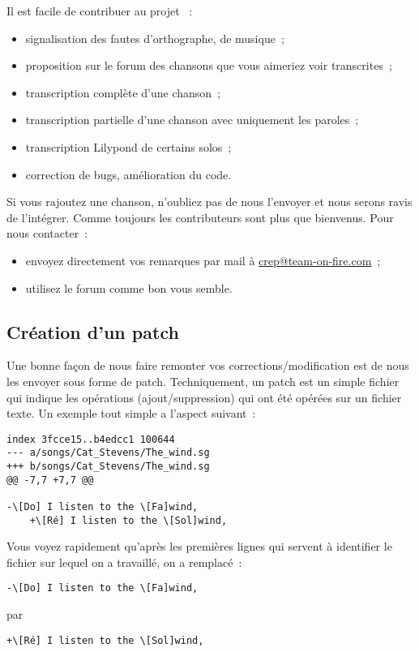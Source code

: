 \documentclass[online]{patacrep}
\begin{document}
Il est facile de contribuer au projet ~:

\begin{itemize}
\item signalisation des fautes d'orthographe, de musique~;
\item proposition sur le forum des chansons que vous aimeriez voir transcrites~;
\item transcription complète d'une chanson~;
\item transcription partielle d'une chanson avec uniquement les paroles~;
\item transcription Lilypond de certains solos~;
\item correction de bugs, amélioration du code.
\end{itemize}

Si vous rajoutez une chanson, n'oubliez pas de nous l'envoyer et nous
serons ravis de l'intégrer. Comme toujours les contributeurs sont plus
que bienvenus. Pour nous contacter~:

\begin{itemize}
\item envoyez directement vos remarques par mail à
  \url{crep@team-on-fire.com}~;
\item utilisez le forum comme bon vous semble.
\end{itemize}


\subsection{Création d'un patch}

Une bonne façon de nous faire remonter vos corrections/modification
est de nous les envoyer sous forme de patch. Techniquement, un patch
est un simple fichier qui indique les opérations (ajout/suppression)
qui ont été opérées sur un fichier texte. Un exemple tout simple a
l'aspect suivant~:

\begin{verbatim}
index 3fcce15..b4edcc1 100644
--- a/songs/Cat_Stevens/The_wind.sg
+++ b/songs/Cat_Stevens/The_wind.sg
@@ -7,7 +7,7 @@

-\[Do] I listen to the \[Fa]wind,
    +\[Ré] I listen to the \[Sol]wind,
\end{verbatim}

Vous voyez rapidement qu'après les premières lignes qui servent à
identifier le fichier sur lequel on a travaillé, on a remplacé~:
\begin{verbatim}
-\[Do] I listen to the \[Fa]wind,
\end{verbatim}
par
\begin{verbatim}
+\[Ré] I listen to the \[Sol]wind,
\end{verbatim}
\end{document}
